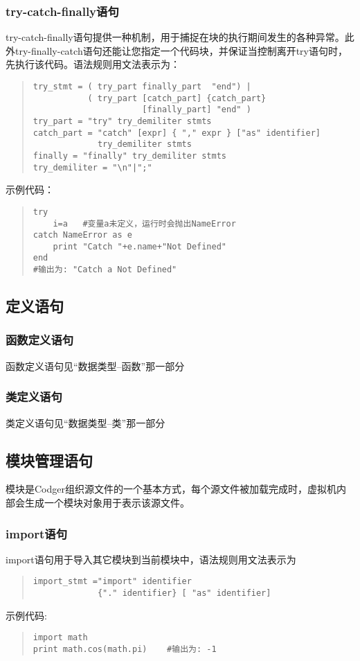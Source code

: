 \subsubsection{try-catch-finally语句}
try-catch-finally语句提供一种机制，用于捕捉在块的执行期间发生的各种异常。此外try-finally-catch语句还能让您指定一个代码块，并保证当控制离开try语句时，先执行该代码。语法规则用文法表示为：
\begin{quote}
\begin{verbatim}
try_stmt = ( try_part finally_part  "end") |
           ( try_part [catch_part] {catch_part} 
                      [finally_part] "end" )
try_part = "try" try_demiliter stmts
catch_part = "catch" [expr] { "," expr } ["as" identifier]
             try_demiliter stmts
finally = "finally" try_demiliter stmts
try_demiliter = "\n"|";"
\end{verbatim}
\end{quote}
示例代码：
\begin{quote}
\begin{verbatim}
try 
    i=a   #变量a未定义，运行时会抛出NameError
catch NameError as e
    print "Catch "+e.name+"Not Defined"
end 
#输出为: "Catch a Not Defined"
\end{verbatim}

\end{quote}


\subsection{定义语句}
\subsubsection{函数定义语句}
函数定义语句见``数据类型--函数''那一部分
\subsubsection{类定义语句}
类定义语句见``数据类型--类''那一部分

\subsection{模块管理语句}
模块是Codger组织源文件的一个基本方式，每个源文件被加载完成时，虚拟机内部会生成一个模块对象用于表示该源文件。
\subsubsection{import语句}
import语句用于导入其它模块到当前模块中，语法规则用文法表示为
\begin{quote}
\begin{verbatim}
import_stmt ="import" identifier 
             {"." identifier} [ "as" identifier]
\end{verbatim}
\end{quote}
示例代码:
\begin{quote}
\begin{verbatim}
import math
print math.cos(math.pi)    #输出为: -1
\end{verbatim}
\end{quote}
